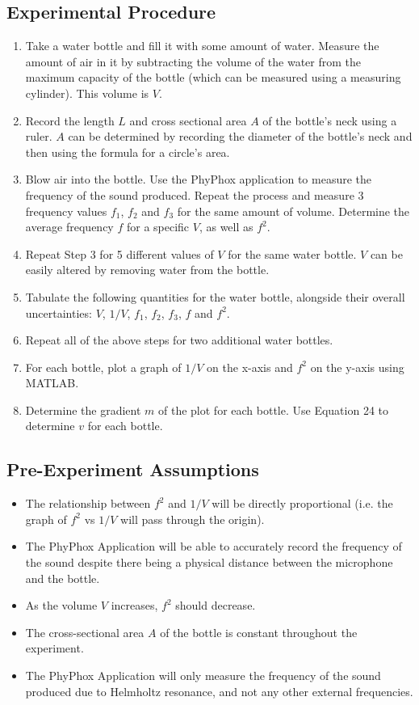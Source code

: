 \documentclass[10pt, a4paper]{article}
\begin{document}
\subsection*{Experimental Procedure}
\begin{enumerate}
 \item Take a water bottle and fill it with some amount of water. Measure the amount of air in it by subtracting the volume of the water from the maximum capacity of the bottle (which can be measured using a measuring cylinder). This volume is $V$.
 \item Record the length $L$ and cross sectional area $A$ of the bottle’s neck using a ruler. $A$ can be determined by recording the diameter of the bottle’s neck and then using the formula for a circle’s area.
 \item Blow air into the bottle. Use the PhyPhox application to measure the frequency of the sound produced. Repeat the process and measure 3 frequency values $f_1$, $f_2$ and $f_3$ for the same amount of volume. Determine the average frequency $f$ for a specific $V$, as well as $f^2$.
 \item Repeat Step 3 for 5 different values of $V$ for the same water bottle. $V$ can be easily altered by removing water from the bottle. 
 \item Tabulate the following quantities for the water bottle, alongside their overall uncertainties: $V$, $1/V$, $f_1$, $f_2$, $f_3$, $f$ and $f^2$. 
\item Repeat all of the above steps for two additional water bottles.
\item For each bottle, plot a graph of $1/V$ on the x-axis and $f^2$ on the y-axis using MATLAB.
\item Determine the gradient $m$ of the plot for each bottle. Use Equation 24 to determine $v$ for each bottle.
\end{enumerate}

\subsection*{Pre-Experiment Assumptions}
\begin{itemize}
    \item The relationship between $f^2$ and $1/V$ will be directly proportional (i.e. the graph of $f^2$ vs $1/V$ will pass through the origin). 
    \item The PhyPhox Application will be able to accurately record the frequency of the sound despite there being a physical distance between the microphone and the bottle. 
    \item As the volume $V$ increases, $f^2$ should decrease. 
    \item The cross-sectional area $A$ of the bottle is constant throughout the experiment. 
    \item The PhyPhox Application will only measure the frequency of the sound produced due to Helmholtz resonance, and not any other external frequencies. 
\end{itemize}
\end{document}
